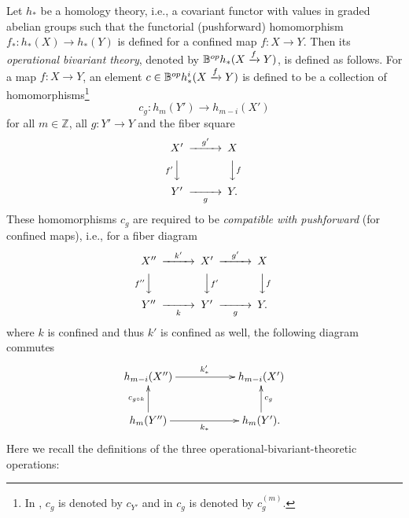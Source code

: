 \documentclass[a4paper]{amsart}
\begin{document}
Let $h_*$ be a homology theory, i.e., a covariant functor with values in graded abelian groups such that the functorial (pushforward) homomorphism $f_*:h_*(X) \to h_*(Y)$ is defined for a confined map $f:X \to Y$.  Then its \emph{operational bivariant theory}, denoted by $\mathbb B^{op}h_*(X \xrightarrow f Y)$, is defined as follows. For a map $f:X \to Y$, an element $c \in \mathbb B^{op}h_*^i(X \xrightarrow f Y)$ is defined to be a collection of
homomorphisms\footnote{In \cite[\S 8 Operational Theories]{FM}, $c_g$ is denoted by $c_{Y'}$ and in \cite[\S 17. 1]{Ful} $c_g$ is denoted by $c^{(m)}_g$.}
\begin{equation*}
c_g:h_m(Y') \to h_{m-i}(X')
\end{equation*}
for all $m \in \mathbb Z$, all $g:Y' \to Y$ and the fiber square \, \, \, 
$$\CD
X' @> {g'}  >> X\\
@V {f'} VV @VV fV\\
Y' @>> {g} > Y.\\
\endCD
$$
These homomorphisms $c_g$ are
required to be \emph{compatible with pushforward} (for confined maps), i.e., for a fiber diagram
\, \, \, 
\begin{equation}\label{cd-123}
\CD
X'' @> {k'}  >> X' @> {g'}  >> X\\
@V {f''} VV @VV f'V @VV fV\\
Y'' @>> {k} > Y' @>> {g} > Y.\\
\endCD
\end{equation}
where $k$ is confined and thus $k'$ is confined as well, 
the following diagram commutes
\begin{equation}
\xymatrix
{h_{m-i}(X'')  \ar[rr]^{k'_*} && h_{m-i}(X')\\
h_m(Y'') \ar[u]^{c_{g\circ k}}  \ar[rr]_{k_*} && h_m(Y'). \ar[u]_{c_g}
}
\end{equation}
Here we recall the definitions of the three operational-bivariant-theoretic operations:
\end{document}
